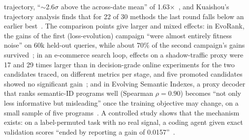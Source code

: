 \documentclass[sigconf,nonacm]{acmart}
\begin{document}
trajectory, ``${\sim}$2.6$\sigma$ above the across-date mean'' of 1.63$\times$~\cite{chandran2026autoresearch}, and
Kuaishou's trajectory analysis finds that for 22 of 30 methods the last round falls below an earlier
best~\cite{zhuang2026trajectories}. The comparison points give larger and mixed effects: in EvoRank, the gains of the first
(loss-evolution) campaign ``were almost entirely fitness noise'' on 60k held-out queries, while about 70\% of the
second campaign's gains survived~\cite{patel2026evorank}; in an e-commerce search loop, effects on a shadow-traffic
proxy were 17 and 29 times larger than in decision-grade online experiments for the two candidates traced, on
different metrics per stage, and five promoted candidates
showed no significant gain~\cite{wang2026pear}; and in Evolving Semantic Indexes, a proxy decoder that ranks
semantic-ID programs well (Spearman $\rho = 0.90$) becomes ``not only less informative but misleading'' once the
training objective may change, on a small sample of five programs~\cite{nian2026semanticindex}. A controlled study
shows that the mechanism exists: on a label-permuted task with no real signal, a coding agent given exact validation
scores ``ended by reporting a gain of 0.0157''~\cite{yao2026feedbackcontract}.
\end{document}
